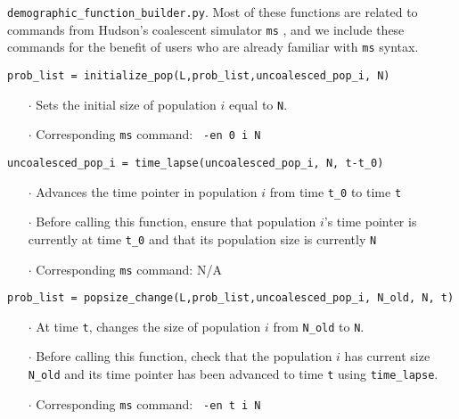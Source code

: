 \documentclass[12pt]{article}
\begin{document}
\noindent \verb|demographic_function_builder.py|. Most of these functions are related to commands from Hudson's coalescent simulator \texttt{ms} \cite{ms}, and we include these commands for the benefit of users who are already familiar with \texttt{ms} syntax. 
\vspace{ 0.5 cm}

\begin{Verbatim}
prob_list = initialize_pop(L,prob_list,uncoalesced_pop_i, N)
\end{Verbatim}

\begin{enumerate}
\item[$\cdot$]Sets the initial size of population $i$ equal to \texttt{N}. 

\item[$\cdot$]Corresponding \texttt{ms} command: \verb| -en 0 i N|
\end{enumerate}
\vspace{0.5 cm}

\begin{Verbatim}
uncoalesced_pop_i = time_lapse(uncoalesced_pop_i, N, t-t_0)
\end{Verbatim}

\begin{enumerate}
\item[$\cdot$] Advances the time pointer in population $i$ from time \verb|t_0| to time \texttt{t}
\item[$\cdot$] Before calling this function, ensure that population $i$'s time pointer is currently at time \verb|t_0| and that its population size is currently \texttt{N}
\item[$\cdot$]Corresponding \texttt{ms} command: N/A
\end{enumerate}
\vspace{0.5 cm}

\begin{Verbatim}
prob_list = popsize_change(L,prob_list,uncoalesced_pop_i, N_old, N, t)
\end{Verbatim}

\begin{enumerate}
\item[$\cdot$] At time \texttt{t}, changes the size of population $i$ from \verb|N_old| to \texttt{N}.
\item[$\cdot$] Before calling this function, check that the population $i$ has current size \verb|N_old| and its time pointer has been advanced to time \texttt{t} using \verb|time_lapse|.
\item[$\cdot$]Corresponding \texttt{ms} command: \verb| -en t i N|
\end{enumerate}
\end{document}
